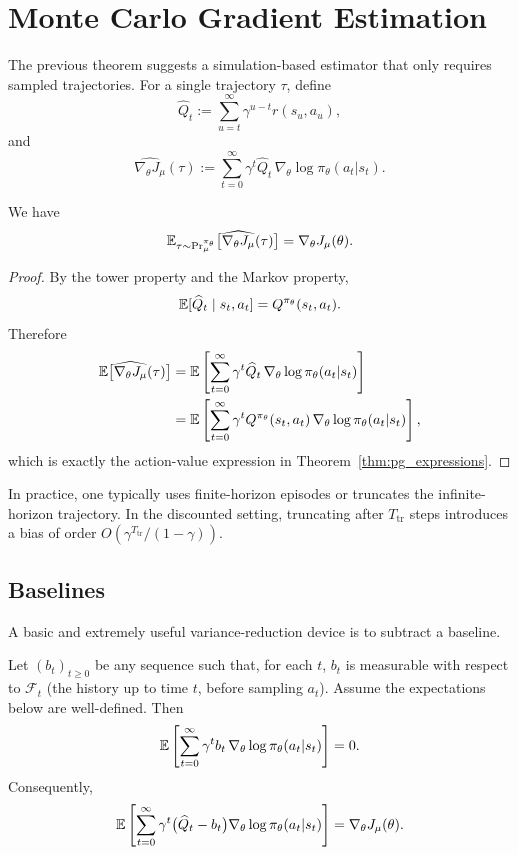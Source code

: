 \section{Monte Carlo Gradient Estimation}

The previous theorem suggests a simulation-based estimator that only requires sampled
trajectories. For a single trajectory $\tau$, define
\[
\widehat Q_t := \sum_{u=t}^\infty \gamma^{u-t} r(s_u,a_u),
\]
and
\[
\widehat{\nabla_\theta J_\mu}(\tau)
:=
\sum_{t=0}^\infty \gamma^t \widehat Q_t \,\nabla_\theta \log \pi_\theta(a_t|s_t).
\]

\begin{lemma}\label{lemma:unbiased_grad}
We have
\[
\mathbb{E}_{\tau\sim {\Pr}_\mu^{\pi_\theta}}
\big[\widehat{\nabla_\theta J_\mu}(\tau)\big]
=
\nabla_\theta J_\mu(\theta).
\]
\end{lemma}

\begin{proof}
By the tower property and the Markov property,
\[
\mathbb{E}[\widehat Q_t\mid s_t,a_t]=Q^{\pi_\theta}(s_t,a_t).
\]
Therefore
\begin{align*}
\mathbb{E}\big[\widehat{\nabla_\theta J_\mu}(\tau)\big]
&=
\mathbb{E}\left[\sum_{t=0}^\infty \gamma^t \widehat Q_t \,\nabla_\theta \log \pi_\theta(a_t|s_t)\right] \\
&=
\mathbb{E}\left[\sum_{t=0}^\infty \gamma^t Q^{\pi_\theta}(s_t,a_t)\,\nabla_\theta \log \pi_\theta(a_t|s_t)\right],
\end{align*}
which is exactly the action-value expression in Theorem~\ref{thm:pg_expressions}.
\end{proof}

In practice, one typically uses finite-horizon episodes or truncates the infinite-horizon
trajectory. In the discounted setting, truncating after $T_{\mathrm{tr}}$ steps introduces
a bias of order $O(\gamma^{T_{\mathrm{tr}}}/(1-\gamma))$.

\subsection{Baselines}

A basic and extremely useful variance-reduction device is to subtract a baseline.

\begin{lemma}
\label{lem:baseline_unbiased}
Let $(b_t)_{t\ge 0}$ be any sequence such that, for each $t$, $b_t$ is measurable with
respect to $\mathcal{F}_t$ (the history up to time $t$, before sampling $a_t$). Assume the
expectations below are well-defined. Then
\[
\mathbb{E}\left[
\sum_{t=0}^\infty \gamma^t b_t \,\nabla_\theta \log \pi_\theta(a_t|s_t)
\right]
=
0.
\]
Consequently,
\[
\mathbb{E}\left[
\sum_{t=0}^\infty \gamma^t \big(\widehat Q_t-b_t\big)\nabla_\theta \log \pi_\theta(a_t|s_t)
\right]
=
\nabla_\theta J_\mu(\theta).
\]
\end{lemma}

